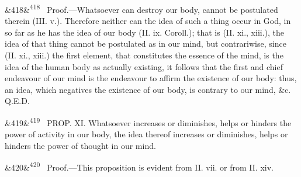 \documentclass[12pt]{article}
\newcommand{\para}[1][]{\par\noindent\ifx&#1&\else\textsuperscript{\footnotesize #1}~\fi}
\begin{document}
\para[418] Proof.---Whatsoever can destroy our body, cannot be postulated therein (III. v.). Therefore neither can the idea of such a thing occur in God, in so far as he has the idea of our body (II. ix. Coroll.); that is (II. xi., xiii.), the idea of that thing cannot be postulated as in our mind, but contrariwise, since (II. xi., xiii.) the first element, that constitutes the essence of the mind, is the idea of the human body as actually existing, it follows that the first and chief endeavour of our mind is the endeavour to affirm the existence of our body: thus, an idea, which negatives the existence of our body, is contrary to our mind, \&c. Q.E.D.

\para[419] PROP. XI. Whatsoever increases or diminishes, helps or hinders the power of activity in our body, the idea thereof increases or diminishes, helps or hinders the power of thought in our mind.

\para[420] Proof.---This proposition is evident from II. vii. or from II. xiv.
\end{document}
